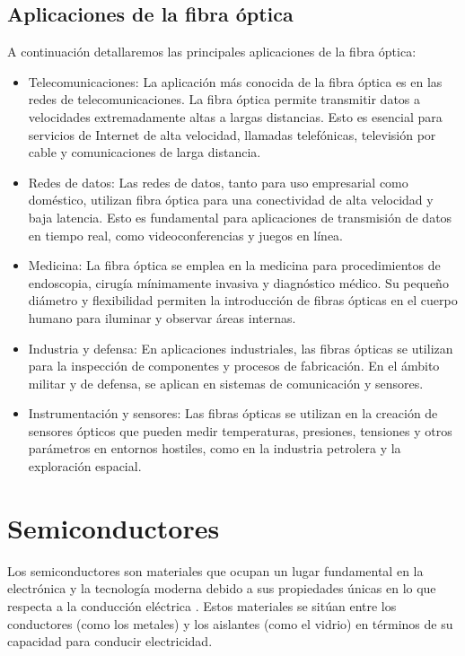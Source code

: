 \documentclass[10.5pt]{article}
\begin{document}
    \subsection{Aplicaciones de la fibra óptica}
    A continuación detallaremos las principales aplicaciones de la fibra óptica:
    \begin{itemize}
        \item Telecomunicaciones: La aplicación más conocida de la fibra óptica es en las redes de telecomunicaciones. La fibra óptica permite transmitir datos a velocidades extremadamente altas a largas distancias. Esto es esencial para servicios de Internet de alta velocidad, llamadas telefónicas, televisión por cable y comunicaciones de larga distancia.
        \item Redes de datos: Las redes de datos, tanto para uso empresarial como doméstico, utilizan fibra óptica para una conectividad de alta velocidad y baja latencia. Esto es fundamental para aplicaciones de transmisión de datos en tiempo real, como videoconferencias y juegos en línea.
        \item Medicina: La fibra óptica se emplea en la medicina para procedimientos de endoscopia, cirugía mínimamente invasiva y diagnóstico médico. Su pequeño diámetro y flexibilidad permiten la introducción de fibras ópticas en el cuerpo humano para iluminar y observar áreas internas.
        \item Industria y defensa: En aplicaciones industriales, las fibras ópticas se utilizan para la inspección de componentes y procesos de fabricación. En el ámbito militar y de defensa, se aplican en sistemas de comunicación y sensores.
        \item Instrumentación y sensores: Las fibras ópticas se utilizan en la creación de sensores ópticos que pueden medir temperaturas, presiones, tensiones y otros parámetros en entornos hostiles, como en la industria petrolera y la exploración espacial.
    \end{itemize}
    \section{Semiconductores}
    Los semiconductores son materiales que ocupan un lugar fundamental en la electrónica y la tecnología moderna debido a sus propiedades únicas en lo que respecta a la conducción eléctrica \cite{rodriguez}. Estos materiales se sitúan entre los conductores (como los metales) y los aislantes (como el vidrio) en términos de su capacidad para conducir electricidad.
\end{document}
